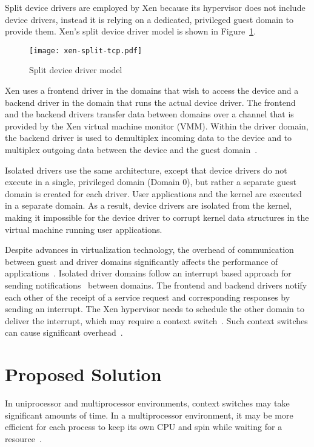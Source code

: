 Split device drivers are employed by Xen because its hypervisor
does not include device drivers,
instead it is relying on a dedicated, privileged guest domain to provide them.
Xen's split device driver model is shown in Figure~\ref{fig:xen-split}.
\begin{figure}[!ht]
\centering
\texttt{[image: xen-split-tcp.pdf]}
\caption{Split device driver model}
\label{fig:xen-split}
\end{figure}
Xen uses a frontend driver in the domains that wish to access the device
and a backend driver in the domain that runs the actual device driver. The
frontend and the backend drivers transfer data between domains over
a channel that is provided by the Xen virtual machine monitor (VMM).
Within the driver domain, the backend driver is used to demultiplex
incoming data to the device and to multiplex outgoing data between the
device and the guest domain~\cite{driverdomain}.

Isolated drivers use the same architecture, except that device drivers
do not execute in a single, privileged domain (Domain 0), but rather
a separate guest domain is created for each driver.
User applications and the kernel are executed in a separate domain.
As a result, device drivers are isolated from the 
kernel, making it impossible for the device driver to corrupt kernel
data structures in the virtual machine running user applications.

Despite advances in virtualization technology, the overhead of
communication between guest and driver domains significantly
affects the performance of applications~\cite{barham2003xen,
Sugerman:2001:VID:647055.715774, Menon:2006:ONV:1267359.1267361}. Isolated
driver domains follow an interrupt based approach for sending
notifications~\cite{barham2003xen} between domains. The frontend and backend 
drivers notify each other of the receipt of a service request and corresponding responses
by sending an interrupt. The Xen hypervisor needs to schedule the
other domain to deliver the interrupt, which may require a context
switch~\cite{barham2003xen}. Such context switches can cause significant
overhead~\cite{Li:2007:QCC:1281700.1281702, Mogul:1991:ECS:106973.106982}.

\section {Proposed Solution}
In uniprocessor and multiprocessor environments, context switches may take
significant amounts of time. In a multiprocessor environment, it may be more
efficient for each process to keep its own CPU and spin while waiting
for a resource~\cite{Bovet:2005:ULK:1077084}. 

